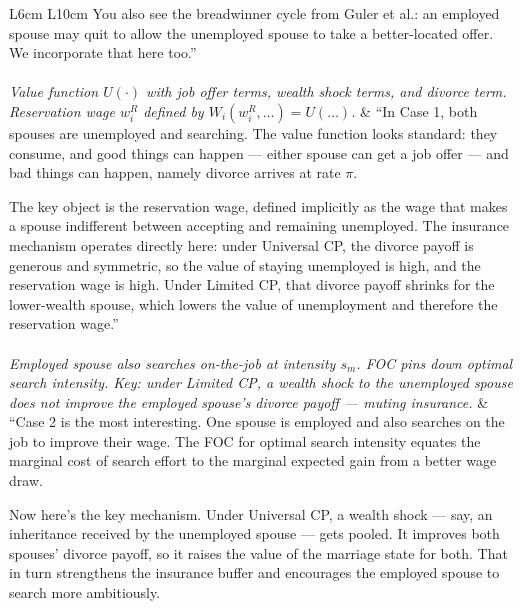 \documentclass[11pt, a4paper]{article}
\begin{document}
\begin{longtable}{L{6cm} L{10cm}}
You also see the breadwinner cycle from Guler et al.: an employed spouse may quit to allow the unemployed spouse to take a better-located offer. We incorporate that here too.'' \\[1em]

\\
\textit{Value function $U(\cdot)$ with job offer terms, wealth shock terms, and divorce term.
Reservation wage $w_i^R$ defined by $W_i(w_i^R, \ldots) = U(\ldots)$.} &
``In Case 1, both spouses are unemployed and searching. The value function looks standard: they consume, and good things can happen — either spouse can get a job offer — and bad things can happen, namely divorce arrives at rate $\pi$.

The key object is the reservation wage, defined implicitly as the wage that makes a spouse indifferent between accepting and remaining unemployed. The insurance mechanism operates directly here: under Universal CP, the divorce payoff is generous and symmetric, so the value of staying unemployed is high, and the reservation wage is high. Under Limited CP, that divorce payoff shrinks for the lower-wealth spouse, which lowers the value of unemployment and therefore the reservation wage.'' \\[1em]

\\
\textit{Employed spouse also searches on-the-job at intensity $s_m$.
FOC pins down optimal search intensity.
Key: under Limited CP, a wealth shock to the unemployed spouse does not improve the employed spouse's divorce payoff — muting insurance.} &
``Case 2 is the most interesting. One spouse is employed and also searches on the job to improve their wage. The FOC for optimal search intensity equates the marginal cost of search effort to the marginal expected gain from a better wage draw.

Now here's the key mechanism. Under Universal CP, a wealth shock — say, an inheritance received by the unemployed spouse — gets pooled. It improves both spouses' divorce payoff, so it raises the value of the marriage state for both. That in turn strengthens the insurance buffer and encourages the employed spouse to search more ambitiously.


\end{longtable}
\end{document}
